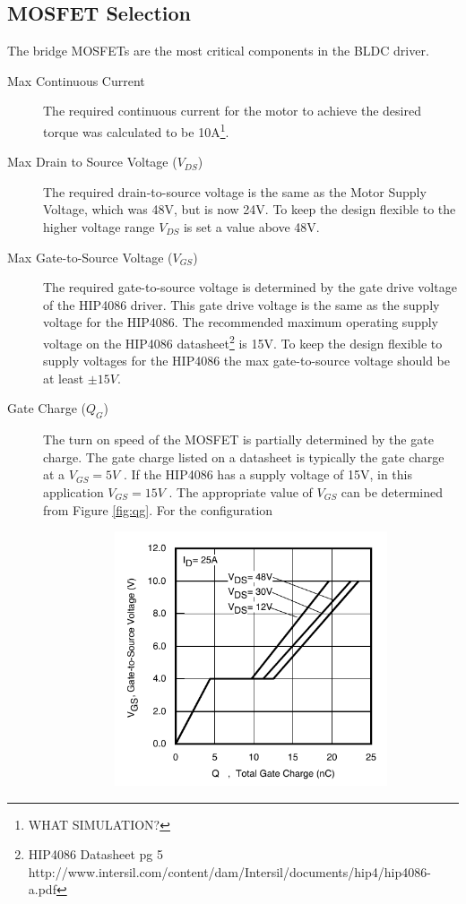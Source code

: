 \documentclass{article}
\begin{document}
\subsection{MOSFET Selection}
The bridge MOSFETs are the most critical components in the BLDC driver. 
\begin{description}
\item[Max Continuous Current]
The required continuous current for the motor to achieve the desired torque was calculated to be 10A\footnote{WHAT SIMULATION?}. 
\item[Max Drain to Source Voltage ($V_{DS}$)] The required drain-to-source voltage is the same as the Motor Supply Voltage, which was 48V, but is now 24V. To keep the design flexible to the higher voltage range $V_{DS}$ is set a value above 48V. 
\item[Max Gate-to-Source Voltage ($V_{GS}$)] The required gate-to-source voltage is determined by the gate drive voltage of the HIP4086 driver. This gate drive voltage is the same as the supply voltage for the HIP4086. The recommended maximum operating supply voltage on the HIP4086 datasheet\footnote{\raggedright HIP4086 Datasheet pg 5 http://www.intersil.com/content/dam/Intersil/documents/hip4/hip4086-a.pdf} is 15V. To keep the design flexible to supply voltages for the HIP4086 the max gate-to-source voltage should be at least $\pm15V$. 
\item[Gate Charge ($Q_G$)] The turn on speed of the MOSFET is partially determined by the gate charge. The gate charge listed on a datasheet is typically the gate charge at a $V_{GS}= 5V$ . If the HIP4086 has a supply voltage of 15V, in this application $V_{GS}= 15V$ . The appropriate value of $V_{GS}$ can be determined from Figure \ref{fig:qg}. For the configuration 
\begin{figure}[h]
	\begin{subfigure}{0.4\textwidth}
		\includegraphics[width=\textwidth]{qg}

\end{subfigure}
\end{figure}
\end{description}
\end{document}
